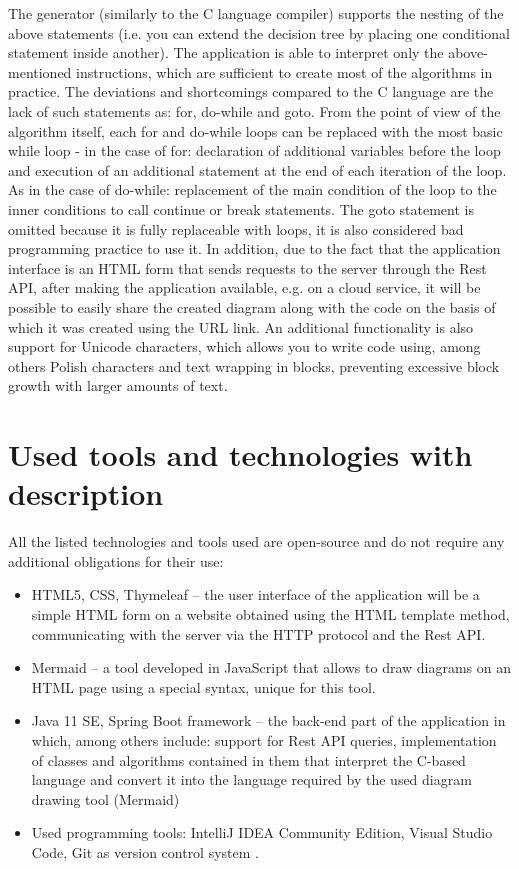 The generator (similarly to the C language compiler) supports the nesting of the above statements (i.e. you can extend the decision tree by placing one conditional statement inside another). The application is able to interpret only the above-mentioned instructions, which are sufficient to create most of the algorithms in practice. The deviations and shortcomings compared to the C language are the lack of such statements as: for, do-while and goto. From the point of view of the algorithm itself, each for and do-while loops can be replaced with the most basic while loop - in the case of for: declaration of additional variables before the loop and execution of an additional statement at the end of each iteration of the loop. As in the case of do-while: replacement of the main condition of the loop to the inner conditions to call continue or break statements. The goto statement is omitted because it is fully replaceable with loops, it is also considered bad programming practice to use it. In addition, due to the fact that the application interface is an HTML form that sends requests to the server through the Rest API, after making the application available, e.g. on a cloud service, it will be possible to easily share the created diagram along with the code on the basis of which it was created using the URL link. An additional functionality is also support for Unicode characters, which allows you to write code using, among others Polish characters and text wrapping in blocks, preventing excessive block growth with larger amounts of text.
  
\section{Used tools and technologies with description }
All the listed technologies and tools used are open-source and do not require any additional obligations for their use:

\begin{itemize}
	\item HTML5, CSS, Thymeleaf -- the user interface of the application will be a simple HTML form on a website obtained using the HTML template method, communicating with the server via the HTTP protocol and the Rest API.	
	
	\item Mermaid -- a tool developed in JavaScript that allows to draw diagrams on an HTML page using a special syntax, unique for this tool.
	
	\item Java 11 SE, Spring Boot framework -- the back-end part of the application in which, among others include: support for Rest API queries, implementation of classes and algorithms contained in them that interpret the C-based language and convert it into the language required by the used diagram drawing tool (Mermaid)
	
	\item Used programming tools: IntelliJ IDEA Community Edition, Visual Studio Code, Git as version control system .
		
		
\end{itemize}
	